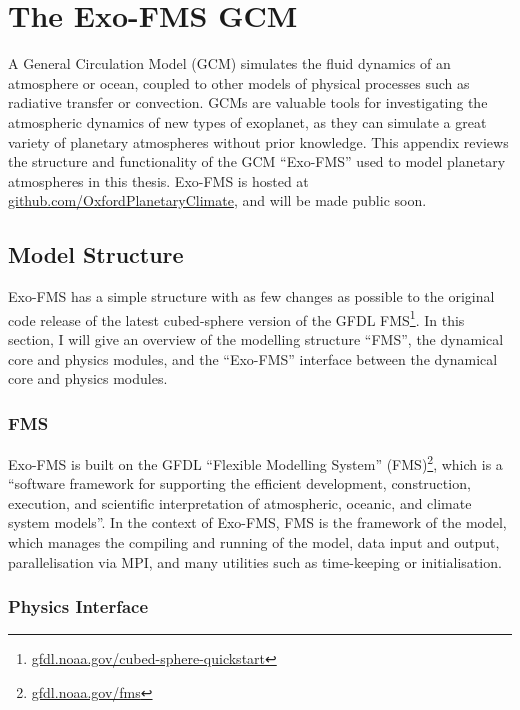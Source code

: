 \newpage
\appendix

\chapter{The Exo-FMS GCM}\label{ap:exo-fms}




A General Circulation Model (GCM) simulates the fluid dynamics of an atmosphere or ocean, coupled to other models of physical processes such as radiative transfer or convection. GCMs are valuable tools for investigating the atmospheric dynamics of new types of exoplanet, as they can simulate a great variety of planetary atmospheres without prior knowledge. This appendix reviews the structure and functionality of the GCM ``Exo-FMS'' used to model planetary atmospheres in this thesis. Exo-FMS is hosted at \url{github.com/OxfordPlanetaryClimate}, and will be made public soon.


\section{Model Structure}

Exo-FMS has a simple structure with as few changes as possible to the original code release of the latest cubed-sphere version of the GFDL FMS\footnote{\url{gfdl.noaa.gov/cubed-sphere-quickstart}}. In this section, I will give an overview of the modelling structure ``FMS'', the dynamical core and physics modules, and the ``Exo-FMS'' interface between the dynamical core and physics modules.


\subsection{FMS}

Exo-FMS is built on the GFDL ``Flexible Modelling System'' (FMS)\footnote{\url{gfdl.noaa.gov/fms}}, which is a ``software framework for supporting the efficient development, construction, execution, and scientific interpretation of atmospheric, oceanic, and climate system models''. In the context of Exo-FMS, FMS is the framework of the model, which manages the compiling and running of the model, data input and output, parallelisation via MPI, and many utilities such as time-keeping or initialisation.


\subsection{Physics Interface}

